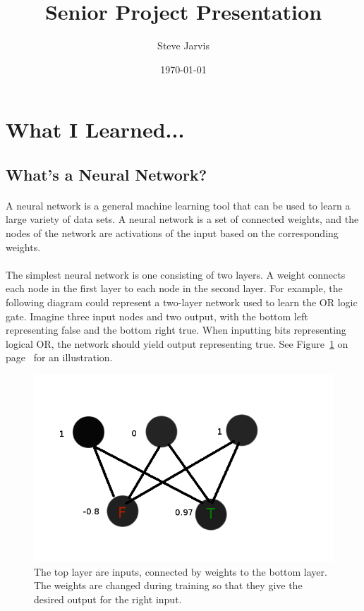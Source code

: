 \documentclass{article}
\title{Senior Project Presentation}
\author{Steve Jarvis}
\date{\today}
\begin{document}
\maketitle

\section{What I Learned...}
\subsection{What's a Neural Network?}
    \paragraph{}A neural network is a general machine learning tool that can be used to 
    learn a large variety of data sets. A neural network is a set of connected weights,
    and the nodes of the network are activations of the input based on the corresponding
    weights.
    \paragraph{}The simplest neural network is one consisting of two layers. A weight
    connects each node in the first layer to each node in the second layer. For example,
    the following diagram could represent a two-layer network used to learn the OR logic
    gate. Imagine three input nodes and two output, with the bottom left representing false
    and the bottom right true. When inputting bits representing logical OR, the network
    should yield output representing true. See Figure~\ref{basicnetwork} on 
    page~\pageref{basicnetwork} for an illustration.
    \begin{figure}
        \centering
        \includegraphics[scale=0.4]{images/perceptron.png}
        \caption{The top layer are inputs, connected by weights to the bottom layer. The
            weights are changed during training so that they give the desired output for
            the right input.}
        \label{basicnetwork}
    \end{figure}
\end{document}
